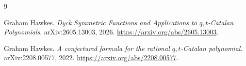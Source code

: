 \documentclass[11pt]{article}
\begin{document}
\begin{thebibliography}{9}

Graham Hawkes.
\newblock \emph{Dyck Symmetric Functions and Applications to
\(q,t\)-Catalan Polynomials}.
\newblock arXiv:2605.13003, 2026.
\newblock \url{https://arxiv.org/abs/2605.13003}.

Graham Hawkes.
\newblock \emph{A conjectured formula for the rational \(q,t\)-Catalan
polynomial}.
\newblock arXiv:2208.00577, 2022.
\newblock \url{https://arxiv.org/abs/2208.00577}.

\end{thebibliography}
\end{document}
